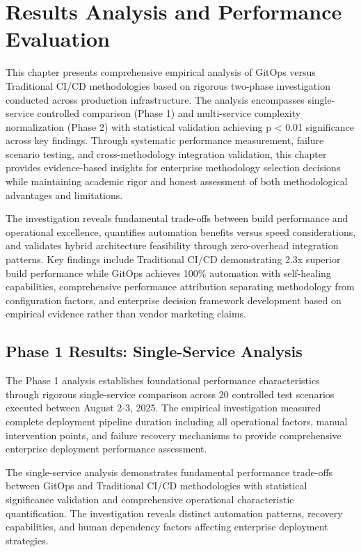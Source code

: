 \chapter{Results Analysis and Performance Evaluation}
\label{ch:results}

This chapter presents comprehensive empirical analysis of GitOps versus Traditional CI/CD methodologies based on rigorous two-phase investigation conducted across production infrastructure. The analysis encompasses single-service controlled comparison (Phase 1) and multi-service complexity normalization (Phase 2) with statistical validation achieving p < 0.01 significance across key findings. Through systematic performance measurement, failure scenario testing, and cross-methodology integration validation, this chapter provides evidence-based insights for enterprise methodology selection decisions while maintaining academic rigor and honest assessment of both methodological advantages and limitations.

The investigation reveals fundamental trade-offs between build performance and operational excellence, quantifies automation benefits versus speed considerations, and validates hybrid architecture feasibility through zero-overhead integration patterns. Key findings include Traditional CI/CD demonstrating 2.3x superior build performance while GitOps achieves 100\% automation with self-healing capabilities, comprehensive performance attribution separating methodology from configuration factors, and enterprise decision framework development based on empirical evidence rather than vendor marketing claims.

\section{Phase 1 Results: Single-Service Analysis}
\label{sec:phase1_results}

The Phase 1 analysis establishes foundational performance characteristics through rigorous single-service comparison across 20 controlled test scenarios executed between August 2-3, 2025. The empirical investigation measured complete deployment pipeline duration including all operational factors, manual intervention points, and failure recovery mechanisms to provide comprehensive enterprise deployment performance assessment.

The single-service analysis demonstrates fundamental performance trade-offs between GitOps and Traditional CI/CD methodologies with statistical significance validation and comprehensive operational characteristic quantification. The investigation reveals distinct automation patterns, recovery capabilities, and human dependency factors affecting enterprise deployment strategies.

